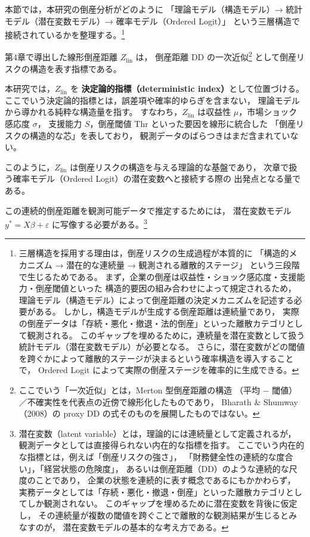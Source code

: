 本節では，本研究の倒産分析がどのように
「理論モデル（構造モデル）→ 統計モデル（潜在変数モデル）→ 確率モデル（Ordered Logit）」
という三層構造で接続されているかを整理する。\footnote{
三層構造を採用する理由は，倒産リスクの生成過程が本質的に
「構造的メカニズム → 潜在的な連続量 → 観測される離散的ステージ」
という三段階で生じるためである。
まず，企業の倒産は収益性・ショック感応度・支援能力・倒産閾値といった
構造的要因の組み合わせによって規定されるため，
理論モデル（構造モデル）によって倒産距離の決定メカニズムを記述する必要がある。
しかし，構造モデルが生成する倒産距離は連続量であり，
実際の倒産データは「存続・悪化・撤退・法的倒産」といった離散カテゴリとして観測される。
このギャップを埋めるために，連続量を潜在変数として扱う統計モデル（潜在変数モデル）が必要となる。
さらに，潜在変数がどの閾値を跨ぐかによって離散的ステージが決まるという確率構造を導入することで，
Ordered Logit によって実際の倒産ステージを確率的に生成できる。
}

第4章で導出した線形倒産距離 $Z_{\text{lin}}$ は，
倒産距離 DD の一次近似\footnote{
ここでいう「一次近似」とは，Merton 型倒産距離の構造
（平均 $-$ 閾値）／不確実性を代表点の近傍で線形化したものであり，
Bharath \& Shumway（2008）の proxy DD の式そのものを展開したものではない。
}
として倒産リスクの構造を表す指標である。

本研究では，$Z_{\text{lin}}$ を
\textbf{決定論的指標（deterministic index）}として位置づける。
ここでいう決定論的指標とは，誤差項や確率的ゆらぎを含まない，
理論モデルから導かれる純粋な構造量を指す。
すなわち，$Z_{\text{lin}}$ は収益性 $\mu$，市場ショック感応度 $\sigma$，
支援能力 $S$，倒産閾値 $\mathrm{Thr}$ といった要因を線形に統合した
「倒産リスクの構造的な芯」を表しており，
観測データのばらつきはまだ含まれていない。

このように，$Z_{\text{lin}}$ は倒産リスクの構造を与える理論的な基盤であり，
次章で扱う確率モデル（Ordered Logit）の潜在変数へと接続する際の
出発点となる量である。

この連続的倒産距離を観測可能データで推定するためには，
潜在変数モデル $y^* = X\beta + \varepsilon$ に写像する必要がある。\footnote{
潜在変数（latent variable）とは，理論的には連続量として定義されるが，
観測データとしては直接得られない内在的な指標を指す。
ここでいう内在的な指標とは，例えば「倒産リスクの強さ」，
「財務健全性の連続的な度合い」，「経営状態の危険度」，
あるいは倒産距離（DD）のような連続的な尺度のことであり，
企業の状態を連続的に表す概念であるにもかかわらず，
実務データとしては「存続・悪化・撤退・倒産」といった離散カテゴリとしてしか観測されない。
このギャップを埋めるために潜在変数を背後に仮定し，
その連続量が複数の閾値を跨ぐことで離散的な観測結果が生じるとみなすのが，
潜在変数モデルの基本的な考え方である。
}

